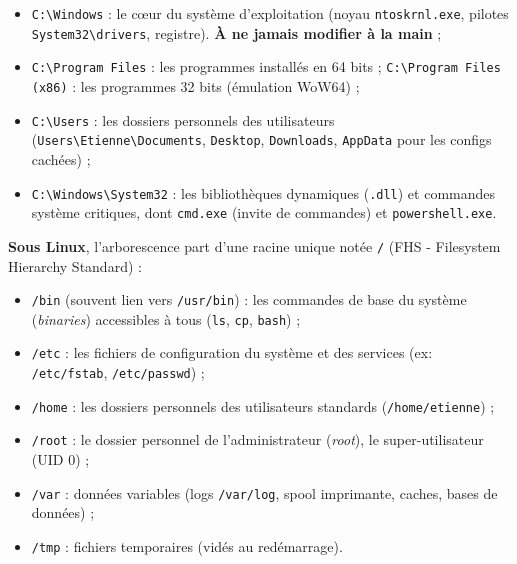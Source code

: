 \documentclass[11pt]{article}
\begin{document}
\begin{itemize}
\item \texttt{C:\textbackslash Windows} : le cœur du système d'exploitation (noyau \texttt{ntoskrnl.exe}, pilotes \texttt{System32\textbackslash drivers}, registre). \textbf{À ne jamais modifier à la main} ;
\item \texttt{C:\textbackslash Program Files} : les programmes installés en 64 bits ; \texttt{C:\textbackslash Program Files (x86)} : les programmes 32 bits (émulation WoW64) ;
\item \texttt{C:\textbackslash Users} : les dossiers personnels des utilisateurs (\texttt{Users\textbackslash Etienne\textbackslash Documents}, \texttt{Desktop}, \texttt{Downloads}, \texttt{AppData} pour les configs cachées) ;
\item \texttt{C:\textbackslash Windows\textbackslash System32} : les bibliothèques dynamiques (\texttt{.dll}) et commandes système critiques, dont \texttt{cmd.exe} (invite de commandes) et \texttt{powershell.exe}.
\end{itemize}

\textbf{Sous Linux}, l'arborescence part d'une racine unique notée \texttt{/} (FHS - Filesystem Hierarchy Standard) :

\begin{itemize}
\item \texttt{/bin} (souvent lien vers \texttt{/usr/bin}) : les commandes de base du système (\emph{binaries}) accessibles à tous (\texttt{ls}, \texttt{cp}, \texttt{bash}) ;
\item \texttt{/etc} : les fichiers de configuration du système et des services (ex: \texttt{/etc/fstab}, \texttt{/etc/passwd}) ;
\item \texttt{/home} : les dossiers personnels des utilisateurs standards (\texttt{/home/etienne}) ;
\item \texttt{/root} : le dossier personnel de l'administrateur (\emph{root}), le super-utilisateur (UID 0) ;
\item \texttt{/var} : données variables (logs \texttt{/var/log}, spool imprimante, caches, bases de données) ;
\item \texttt{/tmp} : fichiers temporaires (vidés au redémarrage).
\end{itemize}
\end{document}

